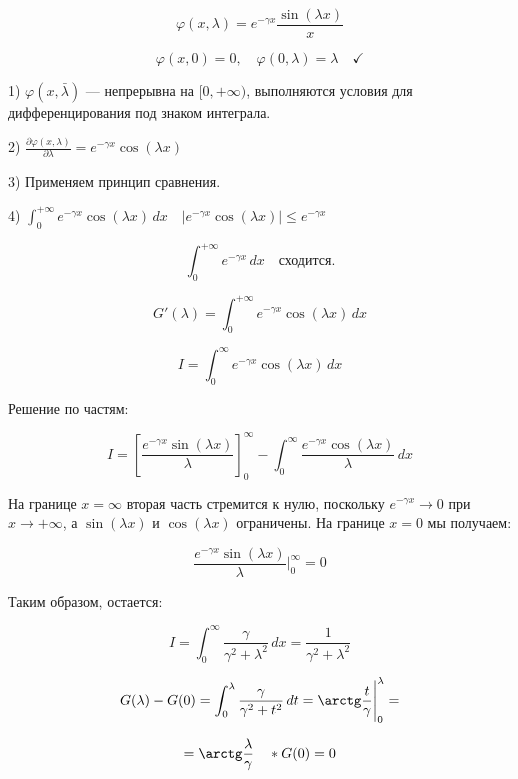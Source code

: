 \documentclass{article}
\begin{document}
\[
\varphi(x, \lambda) = e^{-\gamma x} \frac{\sin(\lambda x)}{x}
\]

\[
\varphi(x, 0) = 0, \quad \varphi(0, \lambda) = \lambda \quad \checkmark
\]

1) \( \varphi(x, \bar{\lambda}) \) — непрерывна на \( [0, +\infty) \), выполняются условия для дифференцирования под знаком интеграла.

2) \( \frac{\partial \varphi(x, \lambda)}{\partial \lambda} = e^{-\gamma x} \cos(\lambda x) \)

3) Применяем принцип сравнения.

4) \( \int_{0}^{+\infty} e^{-\gamma x} \cos(\lambda x) \, dx \quad |e^{-\gamma x} \cos(\lambda x)| \leq e^{-\gamma x} \)

\[
\int_{0}^{+\infty} e^{-\gamma x} \, dx \quad \text{сходится.}
\]



\[
G'(\lambda) = \int_{0}^{+\infty} e^{-\gamma x} \cos(\lambda x) \, dx
\]


\[
I = \int_{0}^{\infty} e^{-\gamma x} \cos(\lambda x) \, dx
\]

Решение по частям:

\[
I = \left[ \frac{e^{-\gamma x} \sin(\lambda x)}{\lambda} \right]_{0}^{\infty} - \int_{0}^{\infty} \frac{e^{-\gamma x} \cos(\lambda x)}{\lambda} \, dx
\]

На границе \(x = \infty\) вторая часть стремится к нулю, поскольку \(e^{-\gamma x} \to 0\) при \(x \to +\infty\), а \( \sin(\lambda x) \) и \( \cos(\lambda x) \) ограничены. На границе \(x = 0\) мы получаем:

\[
\frac{e^{-\gamma x} \sin(\lambda x)}{\lambda} \Big|_0^\infty = 0
\]

Таким образом, остается:

\[
I = \int_{0}^{\infty} \frac{\gamma}{\gamma^2 + \lambda^2} \, dx = \frac{1}{\gamma^2 + \lambda^2}
\]


\[
G(\lambda) - G(0) = \int_{0}^{\lambda} \frac{\gamma}{\gamma^2 + t^2} \, dt = \arctg \frac{t}{\gamma} \Bigg|_{0}^{\lambda} =
\]

\[
= \arctg \frac{\lambda}{\gamma} \quad * G(0) = 0
\]
\end{document}
